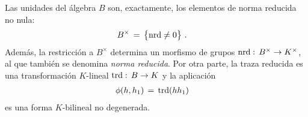 \begin{lemaNormaYTrazaCuaterniones}\label{lema:normaytrazacuaterniones}
	Las unidades del \'{a}lgebra $B$ son, exactamente, los elementos de
	norma reducida no nula:
	\begin{align*}
		B^{\times} & \,=\,\big\{\mathrm{nrd}\not=0\big\}
		\text{ .}
	\end{align*}
	Adem\'{a}s, la restricci\'{o}n a $B^{\times}$ determina un morfismo de
	grupos $\mathrm{nrd} :\,B^{\times}\rightarrow K^{\times}$, al que tambi\'{e}n
	se denomina \emph{norma reducida}. Por otra parte, la traza reducida es
	una transformaci\'{o}n $K$-lineal $\mathrm{trd}:\,B\rightarrow K$ y la
	aplicaci\'{o}n
	\begin{align*}
		\phi(h,h_{1}) & \,=\,\mathrm{trd}(hh_{1})
	\end{align*}
	es una forma $K$-bilineal no degenerada.
\end{lemaNormaYTrazaCuaterniones}

